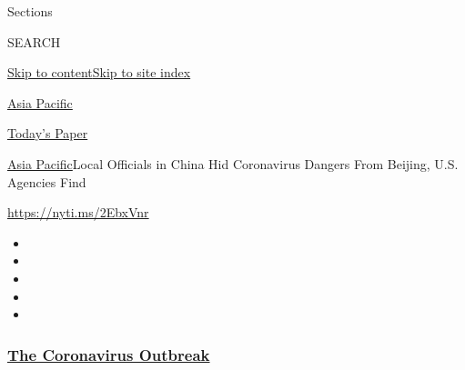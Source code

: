 Sections

SEARCH

\protect\hyperlink{site-content}{Skip to
content}\protect\hyperlink{site-index}{Skip to site index}

\href{https://www.nytimes3xbfgragh.onion/section/world/asia}{Asia
Pacific}

\href{https://myaccount.nytimes3xbfgragh.onion/auth/login?response_type=cookie\&client_id=vi}{}

\href{https://www.nytimes3xbfgragh.onion/section/todayspaper}{Today's
Paper}

\href{/section/world/asia}{Asia Pacific}\textbar{}Local Officials in
China Hid Coronavirus Dangers From Beijing, U.S. Agencies Find

\url{https://nyti.ms/2EbxVnr}

\begin{itemize}
\item
\item
\item
\item
\item
\end{itemize}

\hypertarget{the-coronavirus-outbreak}{%
\subsubsection{\texorpdfstring{\href{https://www.nytimes3xbfgragh.onion/news-event/coronavirus?name=styln-coronavirus-national\&region=TOP_BANNER\&variant=undefined\&block=storyline_menu_recirc\&action=click\&pgtype=Article\&impression_id=f9333230-e38c-11ea-979b-d12b386f95eb}{The
Coronavirus
Outbreak}}{The Coronavirus Outbreak}}\label{the-coronavirus-outbreak}}

